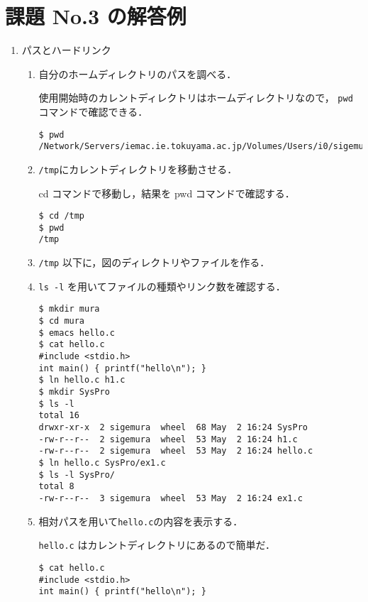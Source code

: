 \documentclass[a4j,twcolumn,11pt,nomag]{ltjarticle}      %
\begin{document}
\onecolumn

\section*{課題 No.3 の解答例}

\begin{enumerate}
\item パスとハードリンク

\begin{enumerate}
\item 自分のホームディレクトリのパスを調べる．

使用開始時のカレントディレクトリはホームディレクトリなので，
\texttt{pwd}コマンドで確認できる．

\begin{lstlisting}[numbers=none]
$ pwd
/Network/Servers/iemac.ie.tokuyama.ac.jp/Volumes/Users/i0/sigemura
\end{lstlisting}

\item \texttt{/tmp}にカレントディレクトリを移動させる．

cd コマンドで移動し，結果を pwd コマンドで確認する．

\begin{lstlisting}[numbers=none]
$ cd /tmp
$ pwd
/tmp
\end{lstlisting}

\item \texttt{/tmp} 以下に，図のディレクトリやファイルを作る．
\item \texttt{ls -l} を用いてファイルの種類やリンク数を確認する．


\begin{lstlisting}[numbers=none]
$ mkdir mura
$ cd mura
$ emacs hello.c
$ cat hello.c
#include <stdio.h>
int main() { printf("hello\n"); }
$ ln hello.c h1.c
$ mkdir SysPro
$ ls -l
total 16
drwxr-xr-x  2 sigemura  wheel  68 May  2 16:24 SysPro
-rw-r--r--  2 sigemura  wheel  53 May  2 16:24 h1.c
-rw-r--r--  2 sigemura  wheel  53 May  2 16:24 hello.c
$ ln hello.c SysPro/ex1.c
$ ls -l SysPro/
total 8
-rw-r--r--  3 sigemura  wheel  53 May  2 16:24 ex1.c
\end{lstlisting}

\item 相対パスを用いて\texttt{hello.c}の内容を表示する．

\texttt{hello.c} はカレントディレクトリにあるので簡単だ．

\begin{lstlisting}[numbers=none]
$ cat hello.c
#include <stdio.h>
int main() { printf("hello\n"); }
\end{lstlisting}


\end{enumerate}
\end{enumerate}
\end{document}
